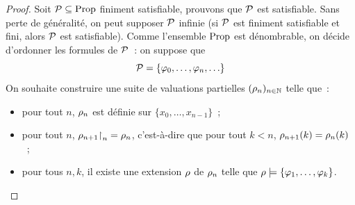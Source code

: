 \begin{proof}
  Soit $\mathcal P\subseteq\operatorname{Prop}$ finiment satisfiable, prouvons que
  $\mathcal P$ est satisfiable. Sans perte de généralité, on peut supposer
  $\mathcal P$ infinie (si $\mathcal P$ est finiment satisfiable et fini, alors
  $\mathcal P$ est satisfiable). Comme l'ensemble $\operatorname{Prop}$ est dénombrable, on
  décide d'ordonner les formules de $\mathcal P$~: on suppose que
  \[\mathcal P = \{\varphi_0,\ldots,\varphi_n,\ldots\}\]
  On souhaite construire une suite de valuations partielles
  $(\rho_n)_{n \in \mathbb N}$ telle que~:
  \begin{itemize}
  \item pour tout $n$, $\rho_n$ est définie sur $\{x_0,\ldots,x_{n-1}\}$~;
  \item pour tout $n$, $\rho_{n+1}\mathbin{\upharpoonright}_{n} = \rho_n$, c'est-à-dire que
    pour tout $k < n$, $\rho_{n+1}(k) = \rho_n(k)$~;
  \item pour tous $n,k$, il existe une extension $\rho$ de
    $\rho_n$ telle que $\rho \models \{\varphi_1,\ldots,\varphi_k\}$.
  \end{itemize}


\end{proof}
